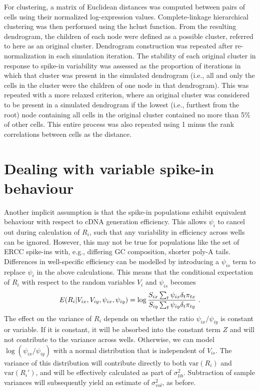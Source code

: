 \documentclass{article}
\begin{document}
For clustering, a matrix of Euclidean distances was computed between pairs of cells using their normalized log-expression values.
Complete-linkage hierarchical clustering was then performed using the hclust function.
From the resulting dendrogram, the children of each node were defined as a possible cluster, referred to here as an original cluster.
Dendrogram construction was repeated after re-normalization in each simulation iteration.
The stability of each original cluster in response to spike-in variability was assessed as the proportion of iterations in which that cluster was present in the simulated dendrogram (i.e., all and only the cells in the cluster were the children of one node in that dendrogram).
This was repeated with a more relaxed criterion, where an original cluster was considered to be present in a simulated dendrogram if the lowest (i.e., furthest from the root) node containing all cells in the original cluster contained no more than 5\% of other cells.
This entire process was also repeated using 1 minus the rank correlations between cells as the distance.

\newpage
\section{Dealing with variable spike-in behaviour}
Another implicit assumption is that the spike-in populations exhibit equivalent behaviour with respect to cDNA generation efficiency.
This allows $\psi_i$ to cancel out during calculation of $R_i$, such that any variability in efficiency across wells can be ignored.
However, this may not be true for populations like the set of ERCC spike-ins with, e.g., differing GC composition, shorter poly-A tails.
Differences in well-specific efficiency can be modelled by introducing a $\psi_{is}$ term to replace $\psi_i$ in the above calculations.
This means that the conditional expectation of $R_i$ with respect to the random variables $V_{i}$ and $\psi_{is}$ becomes
\[
E(R_i | V_{ix}, V_{iy},  \psi_{ix}, \psi_{iy} ) = \log \frac{ S_{ix} \sum_t \psi_{ix}\delta_{t} \pi_{tx} } { S_{iy}\sum_t \psi_{iy}\delta_{t} \pi_{ty} } \;. \\
\]
The effect on the variance of $R_i$ depends on whether the ratio $\psi_{ix}/\psi_{iy}$ is constant or variable.
If it is constant, it will be absorbed into the constant term $Z$ and will not contribute to the variance across wells.
Otherwise, we can model $\log(\psi_{ix}/\psi_{iy})$ with a normal distribution that is independent of $V_{is}$.
The variance of this distribution will contribute directly to both $\mbox{var}(R_i)$ and $\mbox{var}(R_i')$, and will be effectively calculated as part of $\sigma^2_{lib}$.
Subtraction of sample variances will subsequently yield an estimate of $\sigma^2_{vol}$, as before.
\end{document}
